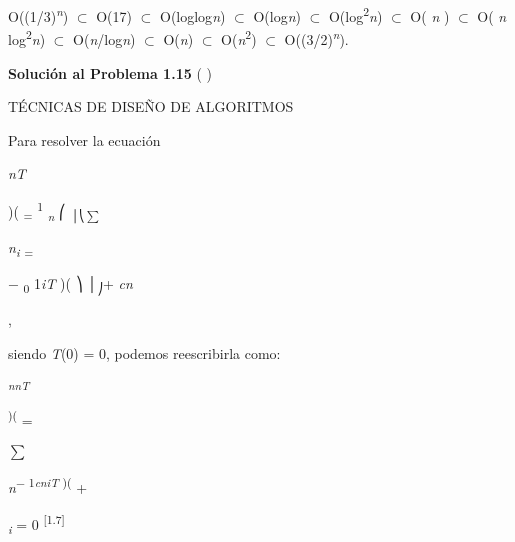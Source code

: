 \documentclass[12pt]{article}
\renewcommand{\_}{\kern-1.5pt\textunderscore\kern-1.5pt}
\begin{document}
\begin{Center}
{\fontsize{10pt}{12.0pt}\selectfont O((1/3)\textit{\textsuperscript{n}}) $ \subset $  O(17) $ \subset $  O(loglog\textit{n}) $ \subset $  O(log\textit{n}) $ \subset $  O(log\textsuperscript{2}\textit{n}) $ \subset $  O( \textit{n }) $ \subset $  O( \textit{n }log\textsuperscript{2}\textit{n}) $ \subset $  O(\textit{n}/log\textit{n}) $ \subset $  O(\textit{n}) $ \subset $  O(\textit{n}\textsuperscript{2}) $ \subset $  O((3/2)\textit{\textsuperscript{n}}). \par}
\end{Center}\par

{\fontsize{10pt}{12.0pt}\selectfont \textbf{Solución al Problema 1.15 }( ) \par}\par

{\fontsize{10pt}{12.0pt} {\fontsize{7pt}{8.4pt}\selectfont TÉCNICAS DE DISEÑO DE ALGORITMOS \par}\par}\par

{\fontsize{10pt}{12.0pt}\selectfont Para resolver la ecuación \par}\par

\textit{nT }\par

)( \textsubscript{= }\textsuperscript{1 }\textit{\textsubscript{n }}⎛ \textsubscript{│⎝$ \sum $ }{\fontsize{7pt}{8.4pt}\selectfont \textit{n\textsubscript{i }}\textsubscript{=}{\fontsize{6pt}{7.2pt}\selectfont $-$ \textsubscript{0 }1\textit{iT })( ⎞ │\textsubscript{⎠}+ \textit{cn }{\fontsize{10pt}{12.0pt}\selectfont , \par}\par}\par}\par

{\fontsize{10pt}{12.0pt}\selectfont siendo \textit{T}(0) = 0, podemos reescribirla como: \par}\par

\textit{\textsuperscript{nnT }}\par

\textsuperscript{)( }={\fontsize{18pt}{21.6pt}\selectfont $ \sum $ {\fontsize{7pt}{8.4pt}\selectfont \textit{n}\textsuperscript{$-$ 1\textit{cniT })( }+ {\fontsize{6pt}{7.2pt} \textit{\textsubscript{i }}= 0 \textsuperscript{[1.7] }\par}\par}\par}\par
\end{document}
